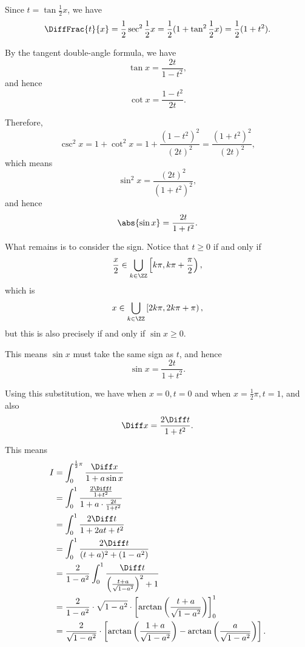 \Question{\currfilebase}

Since \(t = \tan \frac{1}{2}x\), we have
\[
    \DiffFrac{t}{x} = \frac{1}{2} \sec^2 \frac{1}{2}x = \frac{1}{2} (1 + \tan^2 \frac{1}{2}x) = \frac{1}{2}(1 + t^2).
\]

By the tangent double-angle formula, we have
\[
    \tan x = \frac{2t}{1 - t^2},
\]
and hence
\[
    \cot x = \frac{1 - t^2}{2t}.
\]

Therefore,
\[
    \csc^2 x = 1 + \cot^2 x = 1 + \frac{(1 - t^2)^2}{(2t)^2} = \frac{(1 + t^2)^2}{(2t)^2},
\]
which means
\[
    \sin^2 x = \frac{(2t)^2}{(1 + t^2)^2},
\]
and hence
\[
    \abs{\sin x} = \frac{2t}{1 + t^2}.
\]

What remains is to consider the sign. Notice that \(t \geq 0\) if and only if
\[
    \frac{x}{2} \in \bigcup_{k \in \ZZ} \left[k\pi, k\pi + \frac{\pi}{2}\right),
\]
which is
\[
    x \in \bigcup_{k \in \ZZ} \left[2k\pi, 2k\pi + \pi\right),
\]
but this is also precisely if and only if \(\sin x \geq 0\).

This means \(\sin x\) must take the same sign as \(t\), and hence
\[
    \sin x = \frac{2t}{1 + t^2}.
\]

Using this substitution, we have when \(x = 0, t = 0\) and when \(x = \frac{1}{2}\pi, t = 1\), and also
\[
    \Diff x = \frac{2 \Diff t}{1 + t^2}.
\]

This means
\begin{align*}
    I & = \int_{0}^{\frac{1}{2}\pi} \frac{\Diff x}{1 + a \sin x}                                                                                       \\
      & = \int_{0}^{1} \frac{\frac{2 \Diff t}{1 + t^2}}{1 + a \cdot \frac{2t}{1 + t^2}}                                                                \\
      & = \int_{0}^{1} \frac{2 \Diff t}{1 + 2at + t^2}                                                                                                 \\
      & = \int_{0}^{1} \frac{2 \Diff t}{(t + a)^2 + (1 - a^2)}                                                                                         \\
      & = \frac{2}{1 - a^2} \int_{0}^{1} \frac{\Diff t}{\left(\frac{t + a}{\sqrt{1 - a^2}}\right)^2 + 1}                                               \\
      & = \frac{2}{1 - a^2} \cdot \sqrt{1 - a^2} \cdot \left[\arctan\left(\frac{t + a}{\sqrt{1 - a^2}}\right)\right]_{0}^{1}                           \\
      & = \frac{2}{\sqrt{1 - a^2}} \cdot \left[\arctan\left(\frac{1 + a}{\sqrt{1 - a^2}}\right) - \arctan\left(\frac{a}{\sqrt{1 - a^2}}\right)\right].
\end{align*}

